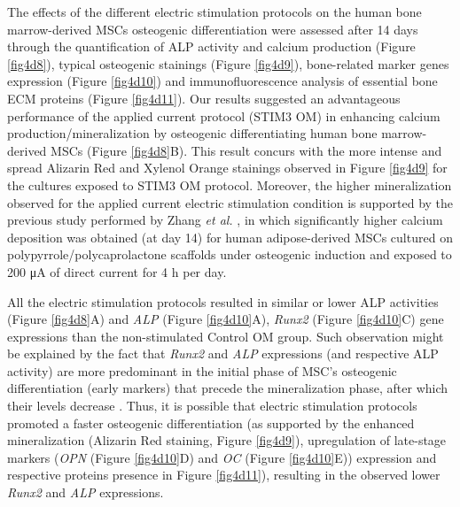 The effects of the different electric stimulation protocols on the human bone marrow-derived \ac{MSCs} osteogenic differentiation were assessed after 14 days through the quantification of ALP activity and calcium production (Figure \ref{fig4d8}), typical osteogenic stainings (Figure \ref{fig4d9}), bone-related marker genes expression (Figure \ref{fig4d10}) and immunofluorescence analysis of essential bone ECM proteins (Figure \ref{fig4d11}). Our results suggested an advantageous performance of the applied current protocol (STIM3 OM) in enhancing calcium production/mineralization by osteogenic differentiating human bone marrow-derived \ac{MSCs} (Figure \ref{fig4d8}B). This result concurs with the more intense and spread Alizarin Red and Xylenol Orange stainings observed in Figure \ref{fig4d9} for the cultures exposed to STIM3 OM protocol. Moreover, the higher mineralization observed for the applied current electric stimulation condition is supported by the previous study performed by Zhang \textit{et al.} \cite{Zhang2016-ul}, in which significantly higher calcium deposition was obtained (at day 14) for human adipose-derived \ac{MSCs} cultured on polypyrrole/polycaprolactone scaffolds under osteogenic induction and exposed to 200 \si{\micro\ampere} of direct current for 4 \si{\hour} per day.

All the electric stimulation protocols resulted in similar or lower ALP activities (Figure \ref{fig4d8}A) and \textit{ALP} (Figure \ref{fig4d10}A), \textit{Runx2} (Figure \ref{fig4d10}C) gene expressions than the non-stimulated Control OM group. Such observation might be explained by the fact that \textit{Runx2} and \textit{ALP} expressions (and respective ALP activity) are more predominant in the initial phase of MSC’s osteogenic differentiation (early markers) that precede the mineralization phase, after which their levels decrease \cite{Beck2003-fx}. Thus, it is possible that electric stimulation protocols promoted a faster osteogenic differentiation (as supported by the enhanced mineralization (Alizarin Red staining, Figure \ref{fig4d9}), upregulation of late-stage markers (\textit{OPN} (Figure \ref{fig4d10}D) and \textit{OC} (Figure \ref{fig4d10}E)) expression and respective proteins presence in Figure \ref{fig4d11}), resulting in the observed lower \textit{Runx2} and \textit{ALP} expressions.

